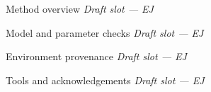\begin{frame}{Method overview}
  \centering\textit{Draft slot --- EJ}
\end{frame}
\begin{frame}{Model and parameter checks}
  \centering\textit{Draft slot --- EJ}
\end{frame}
\begin{frame}{Environment provenance}
  \centering\textit{Draft slot --- EJ}
\end{frame}
\begin{frame}{Tools and acknowledgements}
  \centering\textit{Draft slot --- EJ}
\end{frame}
